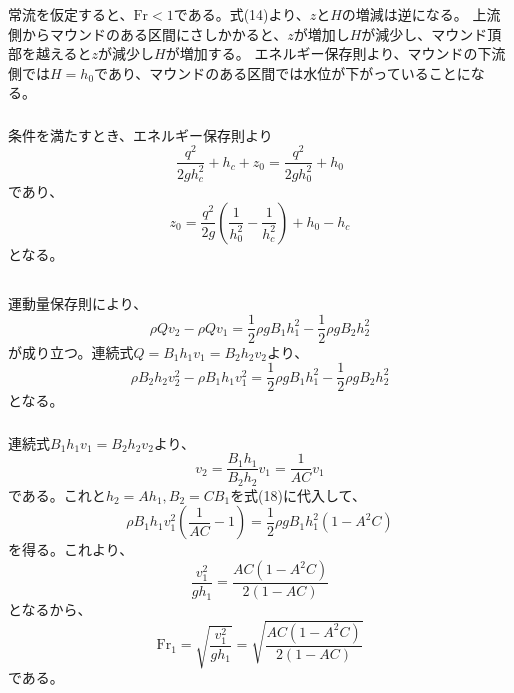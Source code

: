 \documentclass[a4paper]{jsarticle}
\begin{document}
\subsubsection{}
常流を仮定すると、$\mathrm{Fr} < 1$である。式(14)より、$z$と$H$の増減は逆になる。
上流側からマウンドのある区間にさしかかると、$z$が増加し$H$が減少し、マウンド頂部を越えると$z$が減少し$H$が増加する。
エネルギー保存則より、マウンドの下流側では$H = h_0$であり、マウンドのある区間では水位が下がっていることになる。

\subsubsection{}
条件を満たすとき、エネルギー保存則より
\begin{equation}
  \frac{q^2}{2g h_c^2} + h_c + z_0 = \frac{q^2}{2g h_0^2} + h_0
\end{equation}
であり、
\begin{equation}
  z_0 = \frac{q^2}{2g} \left(\frac{1}{h_0^2} - \frac{1}{h_c^2}\right) + h_0 - h_c
\end{equation}
となる。

\subsection{}
\subsubsection{}
運動量保存則により、
\begin{equation}
  \rho Q v_2 - \rho Q v_1 = \frac{1}{2} \rho g B_1 h_1^2 - \frac{1}{2} \rho g B_2 h_2^2
\end{equation}
が成り立つ。連続式$Q = B_1 h_1 v_1 = B_2 h_2 v_2$より、
\begin{equation}
  \rho B_2 h_2 v_2^2 - \rho B_1 h_1 v_1^2 = \frac{1}{2} \rho g B_1 h_1^2 - \frac{1}{2} \rho g B_2 h_2^2
\end{equation}
となる。

\subsubsection{}
連続式$B_1 h_1 v_1 = B_2 h_2 v_2$より、
\begin{equation}
  v_2 = \frac{B_1 h_1}{B_2 h_2} v_1 = \frac{1}{A C} v_1
\end{equation}
である。これと$h_2 = A h_1, B_2 = C B_1$を式(18)に代入して、
\begin{equation}
  \rho B_1 h_1 v_1^2 \left(\frac{1}{A C} - 1\right)
  = \frac{1}{2} \rho g B_1 h_1^2 (1 - A^2 C)
\end{equation}
を得る。これより、
\begin{equation}
  \frac{v_1^2}{g h_1} = \frac{A C (1 - A^2 C)}{2 (1 - A C)}
\end{equation}
となるから、
\begin{equation}
  \mathrm{Fr}_1 = \sqrt{\frac{v_1^2}{g h_1}} = \sqrt{\frac{A C (1 - A^2 C)}{2 (1 - A C)}}
\end{equation}
である。
\end{document}
